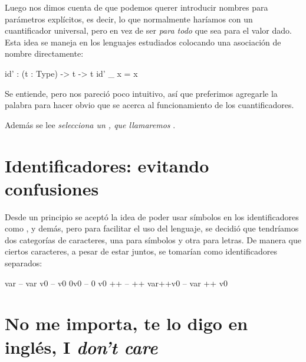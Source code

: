 \begin{designfr}
Luego nos dimos cuenta de que podemos querer introducir nombres para parámetros explícitos, es decir, lo que normalmente haríamos con un cuantificador universal, pero en vez de ser \emph{para todo} que sea para el valor dado. Esta idea se maneja en los lenguajes estudiados colocando una asociación de nombre directamente:

\begin{anglercode}
id' : (t : Type) -> t -> t
id' _ x = x
\end{anglercode}

Se entiende, pero nos pareció poco intuitivo, así que preferimos agregarle la palabra  para hacer obvio que se acerca al funcionamiento de los cuantificadores.

Además se lee \emph{\guillemotleft selecciona un , que llamaremos \guillemotright}.
\end{designfr}

\section{Identificadores: evitando confusiones}

\begin{designfr}
Desde un principio se aceptó la idea de poder usar símbolos en los identificadores como \inlinecode{+}, \inlinecode{*} y demás, pero para facilitar el uso del lenguaje, se decidió que tendríamos dos categorías de caracteres, una para símbolos y otra para letras. De manera que ciertos caracteres, a pesar de estar juntos, se tomarían como identificadores separados:

\begin{anglercode}
var         -- var
v0          -- v0
0v0         -- 0 v0
++          -- ++
var++v0     -- var ++ v0
\end{anglercode}
\end{designfr}

\section{No me importa, te lo digo en inglés, I \emph{don't care}}

